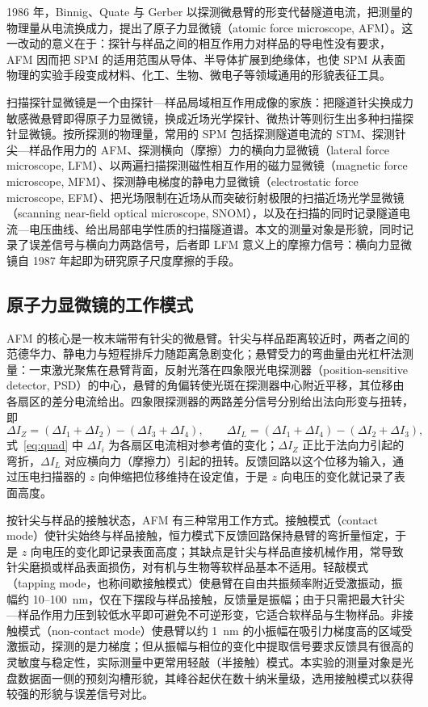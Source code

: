 \documentclass[12pt,a4paper,fontset=windows]{ctexart}
\begin{document}
1986 年，Binnig、Quate 与 Gerber 以探测微悬臂的形变代替隧道电流，把测量的物理量从电流换成力，提出了原子力显微镜（atomic force microscope, AFM）\cite{binnig1986}。这一改动的意义在于：探针与样品之间的相互作用力对样品的导电性没有要求，AFM 因而把 SPM 的适用范围从导体、半导体扩展到绝缘体，也使 SPM 从表面物理的实验手段变成材料、化工、生物、微电子等领域通用的形貌表征工具。

扫描探针显微镜是一个由探针—样品局域相互作用成像的家族：把隧道针尖换成力敏感微悬臂即得原子力显微镜，换成近场光学探针、微热计等则衍生出多种扫描探针显微镜\cite{giessibl2003}。按所探测的物理量，常用的 SPM 包括探测隧道电流的 STM、探测针尖—样品作用力的 AFM、探测横向（摩擦）力的横向力显微镜（lateral force microscope, LFM）、以两遍扫描探测磁性相互作用的磁力显微镜（magnetic force microscope, MFM）、探测静电梯度的静电力显微镜（electrostatic force microscope, EFM）、把光场限制在近场从而突破衍射极限的扫描近场光学显微镜（scanning near-field optical microscope, SNOM），以及在扫描的同时记录隧道电流—电压曲线、给出局部电学性质的扫描隧道谱\cite{mironov2004}。本文的测量对象是形貌，同时记录了误差信号与横向力两路信号，后者即 LFM 意义上的摩擦力信号：横向力显微镜自 1987 年起即为研究原子尺度摩擦的手段\cite{giessibl2003}。

\subsection{原子力显微镜的工作模式}

AFM 的核心是一枚末端带有针尖的微悬臂。针尖与样品距离较近时，两者之间的范德华力、静电力与短程排斥力随距离急剧变化；悬臂受力的弯曲量由光杠杆法测量：一束激光聚焦在悬臂背面，反射光落在四象限光电探测器（position-sensitive detector, PSD）的中心，悬臂的角偏转使光斑在探测器中心附近平移，其位移由各扇区的差分电流给出\cite{mironov2004,meyer1988}。四象限探测器的两路差分信号分别给出法向形变与扭转，即
\begin{equation}
\Delta I_Z = (\Delta I_1+\Delta I_2)-(\Delta I_3+\Delta I_4),\qquad
\Delta I_L = (\Delta I_1+\Delta I_4)-(\Delta I_2+\Delta I_3),
\label{eq:quad}
\end{equation}
式~\eqref{eq:quad} 中 $\Delta I_i$ 为各扇区电流相对参考值的变化；$\Delta I_Z$ 正比于法向力引起的弯折，$\Delta I_L$ 对应横向力（摩擦力）引起的扭转\cite{mironov2004}。反馈回路以这个位移为输入，通过压电扫描器的 $z$ 向伸缩把位移维持在设定值，于是 $z$ 向电压的变化就记录了表面高度。

按针尖与样品的接触状态，AFM 有三种常用工作方式。接触模式（contact mode）使针尖始终与样品接触，恒力模式下反馈回路保持悬臂的弯折量恒定，于是 $z$ 向电压的变化即记录表面高度；其缺点是针尖与样品直接机械作用，常导致针尖磨损或样品表面损伤，对有机与生物等软样品基本不适用\cite{mironov2004}。轻敲模式（tapping mode，也称间歇接触模式）使悬臂在自由共振频率附近受激振动，振幅约 10--100~nm，仅在下摆段与样品接触，反馈量是振幅\cite{mironov2004}；由于只需把最大针尖—样品作用力压到较低水平即可避免不可逆形变，它适合软样品与生物样品\cite{garcia2002}。非接触模式（non-contact mode）使悬臂以约 1~nm 的小振幅在吸引力梯度高的区域受激振动，探测的是力梯度；但从振幅与相位的变化中提取信号要求反馈具有很高的灵敏度与稳定性，实际测量中更常用轻敲（半接触）模式\cite{mironov2004}。本实验的测量对象是光盘数据面一侧的预刻沟槽形貌，其峰谷起伏在数十纳米量级，选用接触模式以获得较强的形貌与误差信号对比。
\end{document}
